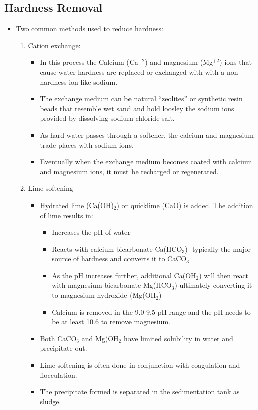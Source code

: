\subsection{Hardness Removal}
\begin{itemize}
\item Two common methods used to reduce hardness:
\begin{enumerate}
\item Cation exchange:
\begin{itemize}
\item In this process the Calcium (Ca$^{+2}$) and magnesium (Mg$^{+2}$) ions that cause water hardness are replaced or exchanged with with a non-hardness ion like sodium. 
\item The exchange medium can be natural “zeolites” or synthetic resin beads that resemble wet sand and hold loosley the sodium ions provided by dissolving sodium chloride salt.
\item As hard water passes through a softener, the calcium and magnesium trade places with sodium ions. 
\item Eventually when the exchange medium becomes coated with calcium and magnesium ions, it must be recharged or regenerated.
\end{itemize}
\item Lime softening
\begin{itemize}
\item Hydrated lime (Ca(OH)$_2$) or quicklime (CaO) is added.  The addition of lime results in:
\begin{itemize}
\item Increases the pH of water
\item Reacts with calcium bicarbonate Ca(HCO$_3$)- typically the major source of hardness and converts it to CaCO$_3$
\item As the pH increases further, additional Ca(OH$_2$) will then react with magnesium bicarbonate Mg(HCO$_3$) ultimately converting it to magnesium hydroxide (Mg(OH$_2$)
\item Calcium is removed in the 9.0-9.5 pH range and the pH needs to be at least 10.6 to remove magnesium.
\end{itemize}
\item Both CaCO$_3$ and Mg(OH$_2$ have limited solubility in water and precipitate out.  
\item Lime softening is often done in conjunction with coagulation and flocculation.
\item The precipitate formed is separated in the sedimentation tank as sludge.

\end{itemize}
\end{enumerate}
\end{itemize}

